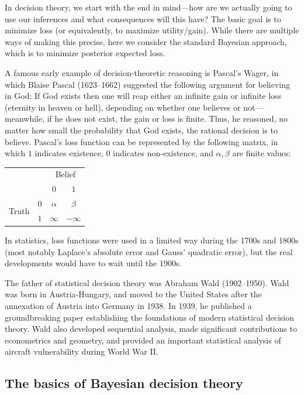 \documentclass[12pt]{article}
\begin{document}
In decision theory, we start with the end in mind---how are we actually going to use our inferences and what consequences will this have? The basic goal is to minimize loss (or equivalently, to maximize utility/gain). While there are multiple ways of making this precise, here we consider the standard Bayesian approach, which is to minimize posterior expected loss.

A famous early example of decision-theoretic reasoning is Pascal's Wager, in which Blaise Pascal (1623--1662) suggested the following argument for believing in God: If God exists then one will reap either an infinite gain or infinite loss (eternity in heaven or hell), depending on whether one believes or not---meanwhile, if he does not exist, the gain or loss is finite. Thus, he reasoned, no matter how small the probability that God exists, the rational decision is to believe. Pascal's loss function can be represented by the following matrix, in which $1$ indicates existence, $0$ indicates non-existence, and $\alpha,\beta$ are finite values:

\begin{center}
\begin{tabular}{l r|c|c|}
\multicolumn{2}{r}{} & \multicolumn{2}{c}{Belief} \\
\multicolumn{2}{r}{}
 &  \multicolumn{1}{c}{$0$}
 & \multicolumn{1}{c}{$1$} \\
\cline{3-4}
\multirow{2}{*}{Truth} 
   & $0$ & $\alpha$ & $\beta$ \\
   \cline{3-4}
   & $1$ & $\infty$ & $-\infty$ \\
   \cline{3-4}
\end{tabular}
\end{center}

In statistics, loss functions were used in a limited way during the 1700s and 1800s (most notably Laplace's absolute error and Gauss' quadratic error), but the real developments would have to wait until the 1900s.

The father of statistical decision theory was Abraham Wald (1902--1950). Wald was born in Austria-Hungary, and moved to the United States after the annexation of Austria into Germany in 1938. In 1939, he published a groundbreaking paper establishing the foundations of modern statistical decision theory. Wald also developed sequential analysis, made significant contributions to econometrics and geometry, and provided an important statistical analysis of aircraft vulnerability during World War II.

\subsection{The basics of Bayesian decision theory}
\end{document}
